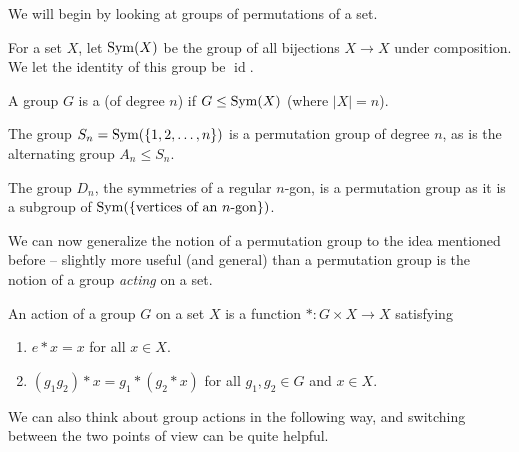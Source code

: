 \documentclass[a4paper]{scrartcl}
\begin{document}
We will begin by looking at groups of permutations of a set.

\begin{definition}[$\sym(X)$]
	For a set $X$, let $\sym(X)$ be the group of all bijections $X \rightarrow X$ under composition. We let the identity of this group be $\operatorname{id}$.
\end{definition}

\begin{definition}
	A group $G$ is a  (of degree $n$) if $G \leq \operatorname{Sym}(X)$ (where $|X| = n$).
\end{definition}

\begin{example}
	The group $S_n = \operatorname{Sym}(\{1, 2, \dots, n\})$ is a permutation group of degree $n$, as is the alternating group $A_n \leq S_n$.

	The group $D_n$, the symmetries of a regular $n$-gon, is a permutation group as it is a subgroup of $\operatorname{Sym}(\{\text{vertices of an $n$-gon}\})$.
\end{example}

We can now generalize the notion of a permutation group to the idea mentioned before -- slightly more useful (and general) than a permutation group is the notion of a group \emph{acting} on a set.

\begin{definition}
	An action of a group $G$ on a set $X$ is a function $*: G \times X \rightarrow X$ satisfying
	\begin{enumerate}[label=(\roman*)]
		\item $e * x = x$ for all $x \in X$.
		\item $(g_1 g_2) * x = g_1 * (g_2 * x)$ for all $g_1, g_2 \in G$ and $x \in X$.
	\end{enumerate}
\end{definition}

We can also think about group actions in the following way, and switching between the two points of view can be quite helpful.
\end{document}
